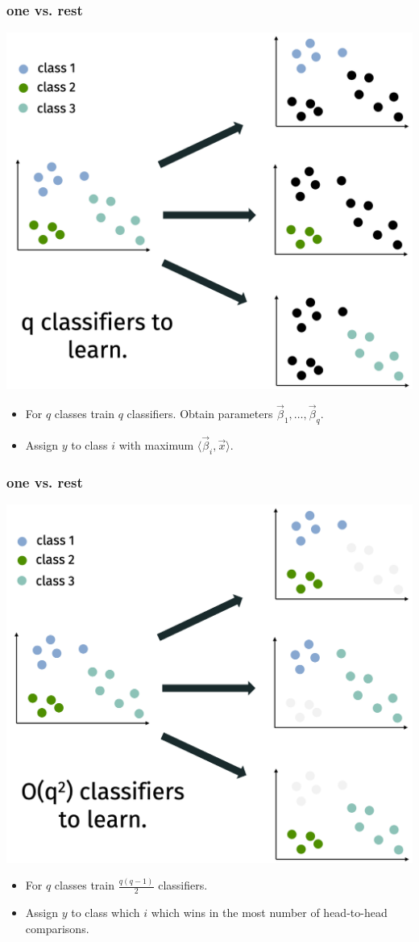 \documentclass[handout,compress]{beamer}
\begin{document}
\begin{frame}
	\frametitle{one vs. rest}
	\small
	\begin{center}
		\includegraphics[width=.6\textwidth]{one_vs_all.png}
	\end{center}
\vspace{-1em}
\begin{itemize}
	\item For $q$ classes train $q$ classifiers. Obtain parameters $\vec{\beta}_1, \ldots, \vec{\beta}_q$.
	\item Assign $y$ to class $i$ with maximum $\langle\vec{\beta}_i,\vec{x}\rangle$.
\end{itemize}
\end{frame}

\begin{frame}
	\frametitle{one vs. rest}
	\small
	\begin{center}
		\includegraphics[width=.6\textwidth]{one_vs_one.png}
	\end{center}
	\vspace{-1em}
	\begin{itemize}
		\item For $q$ classes train $\frac{q(q-1)}{2}$ classifiers. 
		\item Assign $y$ to class which $i$ which wins in the most number of head-to-head comparisons. 
	\end{itemize}
\end{frame}
\end{document}
